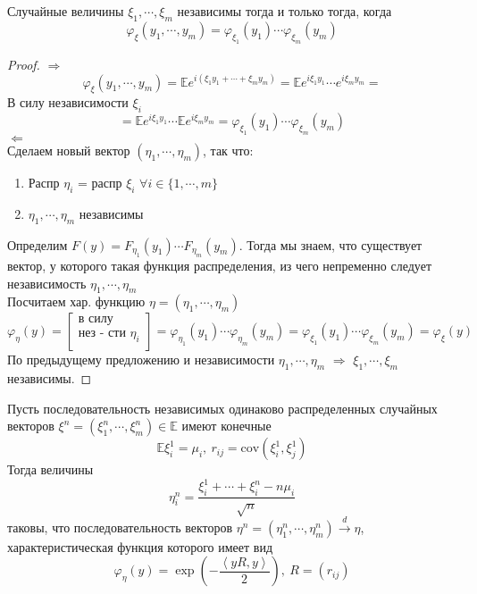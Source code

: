 \begin{corollary}
Случайные величины $\xi_1, \cdots, \xi_m$ независимы тогда и только тогда, когда
\[
    \varphi_{\xi}\left(y_1, \cdots , y_m\right) = \varphi_{\xi_1}\left(y_1\right) \cdots \varphi_{\xi_m}\left(y_m\right)
\]
\end{corollary}
\begin{proof}
$\Rightarrow$
\[
    \varphi_{\xi}(y_1,\cdots,y_m) = \mathbb{E}e^{i(\xi_1 y_1+\cdots+\xi_m y_m)} = \mathbb{E}e^{i
    \xi_1 y_1} \cdots e^{i\xi_m y_m} =
\]
В силу независимости $\xi_i$
\[
    = \mathbb{E}e^{i
    \xi_1 y_1} \cdots \mathbb{E}e^{i\xi_m y_m} =  \varphi_{\xi_1}\left(y_1\right) \cdots \varphi_{\xi_m}\left(y_m\right)
\]
$\Leftarrow$\\
    Сделаем новый вектор $(\eta_1, \cdots , \eta_m)$, так что:\\
    \begin{enumerate}
        \item Распр $\eta_i$ = распр $\xi_i$ \text{ }$\forall i \in \{1, \cdots , m\}$
        \item $\eta_1, \cdots, \eta_m$  независимы
    \end{enumerate}
    Определим
    $F(y) = F_{\eta_1}(y_1) \cdots F_{\eta_m}(y_m)$. Тогда мы знаем, что существует вектор, у которого такая функция распределения, из чего непременно следует независимость $\eta_1, \cdots, \eta_m$\\
    Посчитаем хар. функцию $\eta = (\eta_1, \cdots, \eta_m)$
    \[
        \varphi_{\eta}(y) = 
        \left[\begin{array}{ll}
        \text{в силу}\\
        \text{нез - сти $\eta_i$}\\
        \end{array}
        \right] = \varphi_{\eta_1}(y_1) \cdots \varphi_{\eta_m}(y_m) = \varphi_{\xi_1}(y_1) \cdots \varphi_{\xi_m}(y_m) = \varphi_{\xi}(y)
    \]
    По предыдущему предложению и независимости $\eta_1, \cdots, \eta_m$ $\Rightarrow$ $\xi_1, \cdots, \xi_m$ независимы. 
\end{proof}

\begin{theorem}
Пусть последовательность независимых одинаково распределенных случайных векторов $\xi^n = \left(\xi^n_1, \cdots, \xi^n_m\right) \in \mathbb{E}$ имеют конечные
\[
    \mathbb{E} \xi_i^1 = \mu_i, \ r_{ij} = \text{cov} \left(\xi_i^1, \xi_j^1\right)
\]
Тогда величины
\[
    \eta_i^n = \frac{\xi_i^1+ \cdots + \xi_i^n - n \mu_i}{\sqrt{n}}
\]
таковы, что последовательность векторов $\eta^n = \left(\eta_1^n, \cdots,  \eta_m^n\right) \xrightarrow{d} \eta$, характеристическая функция которого имеет вид
\[
    \varphi_{\eta}\left(y\right) = \exp \left(-\frac{ \left<yR, y \right>}{2}\right), \ R = \left(r_{ij}\right)
\]
\end{theorem}

